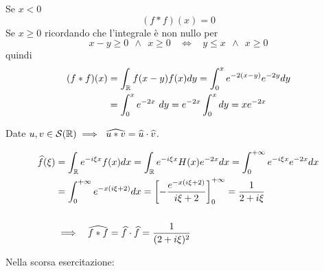 Se $x < 0$
\begin{equation*}
(f*f)(x) = 0
\end{equation*}
Se $x\geqslant 0$ ricordando che l'integrale è non nullo per 
\begin{equation*}
x - y\geqslant 0\ \ \land \ \ x\geqslant 0\ \ \ \ \iff \ \ \ \ y\leqslant x\ \ \land \ \ x\geqslant 0
\end{equation*}
quindi
\begin{align*}
(f*f)(x) & = \int _{\mathbb{R} } f(x - y) f(x) dy = \int ^{x}_{0} e^{ - 2(x - y)} e^{ - 2y} dy\\
 & = \int ^{x}_{0} e^{ - 2x} \ dy = e^{ - 2x}\int ^{x}_{0} dy = xe^{ - 2x}
\end{align*}
\begin{thm}
Date $\displaystyle u,v\in \mathcal{S} (\mathbb{R}) \implies \ \widehat{u*v} = \widehat{u} \cdot \widehat{v}$.
\end{thm}
\begin{align*}
\widehat{f}(\xi) & = \int _{\mathbb{R} } e^{ - i\xi x} f(x) dx = \int _{\mathbb{R} } e^{ - i\xi x} H(x) e^{ - 2x} dx = \int ^{ + \infty }_{0} e^{ - i\xi x} e^{ - 2x} dx\\
 & = \int ^{ + \infty }_{0} e^{ - x(i\xi + 2)} dx = \left[ - \frac{e^{ - x(i\xi + 2)}}{i\xi + 2}\right]^{ + \infty }_{0} = \frac{1}{2 + i\xi }\\
 & \\
 & \implies \ \ \widehat{f*f} = \widehat{f} \cdot \widehat{f} = \frac{1}{(2 + i\xi)^{2}}
\end{align*}
\Soluzione

Nella scorsa esercitazione:

